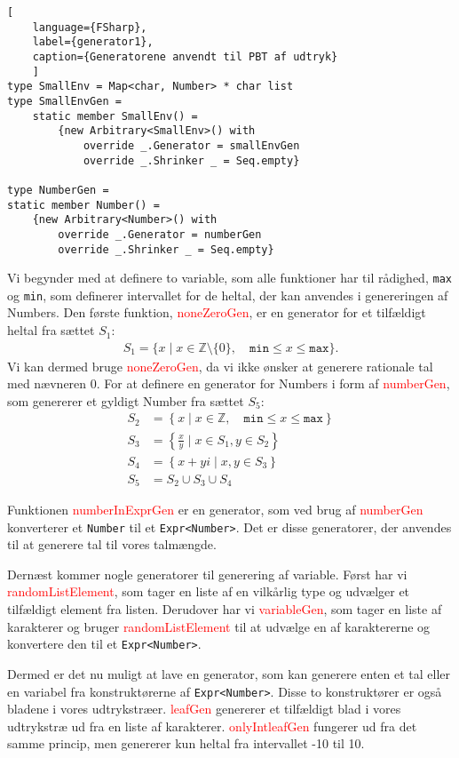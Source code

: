 \begin{lstlisting}[
    language={FSharp}, 
    label={generator1}, 
    caption={Generatorene anvendt til PBT af udtryk}
    ]
type SmallEnv = Map<char, Number> * char list
type SmallEnvGen =
    static member SmallEnv() =
        {new Arbitrary<SmallEnv>() with
            override _.Generator = smallEnvGen
            override _.Shrinker _ = Seq.empty}

type NumberGen =
static member Number() =
    {new Arbitrary<Number>() with
        override _.Generator = numberGen
        override _.Shrinker _ = Seq.empty}    
\end{lstlisting}

Vi begynder med at definere to variable, som alle funktioner har til rådighed, \texttt{max} og \texttt{min}, som definerer intervallet for de heltal, der kan anvendes i genereringen af Numbers. 
Den første funktion, \textcolor{red}{noneZeroGen}, er en generator for et tilfældigt heltal fra sættet $S_1$:
\begin{gather*}
    S_1 = \{ x \mid x \in \mathbb{Z} \setminus \{0\}, \quad \texttt{min} \leq x \leq \texttt{max} \}.
\end{gather*}
Vi kan dermed bruge \textcolor{red}{noneZeroGen}, da vi ikke ønsker at generere rationale tal med nævneren 0. For at definere en generator for Numbers i form af \textcolor{red}{numberGen}, som genererer et gyldigt Number fra sættet $S_5$:
\begin{align*}
    S_2 &= \left\{ x \mid x \in \mathbb{Z}, \quad \texttt{min} \leq x \leq \texttt{max} \right\} \\
    S_3 &= \left\{ \frac{x}{y} \mid x \in S_1, y \in S_2 \right\} \\
    S_4 &= \left\{ x + yi \mid x, y \in S_3 \right\} \\
    S_5 &= S_2 \cup S_3 \cup S_4
\end{align*}

Funktionen \textcolor{red}{numberInExprGen} er en generator, som ved brug af \textcolor{red}{numberGen} konverterer et \texttt{Number} til et \texttt{Expr<Number>}. Det er disse generatorer, der anvendes til at generere tal til vores talmængde.

Dernæst kommer nogle generatorer til generering af variable. Først har vi \textcolor{red}{randomListElement}, som tager en liste af en vilkårlig type og udvælger et tilfældigt element fra listen. Derudover har vi \textcolor{red}{variableGen}, som tager en liste af karakterer og bruger \textcolor{red}{randomListElement} til at udvælge en af karaktererne og konvertere den til et \texttt{Expr<Number>}.

Dermed er det nu muligt at lave en generator, som kan generere enten et tal eller en variabel fra konstruktørerne af \texttt{Expr<Number>}. Disse to konstruktører er også bladene i vores udtrykstræer. \textcolor{red}{leafGen} genererer et tilfældigt blad i vores udtrykstræ ud fra en liste af karakterer. \textcolor{red}{onlyIntleafGen} fungerer ud fra det samme princip, men genererer kun heltal fra intervallet -10 til 10.

